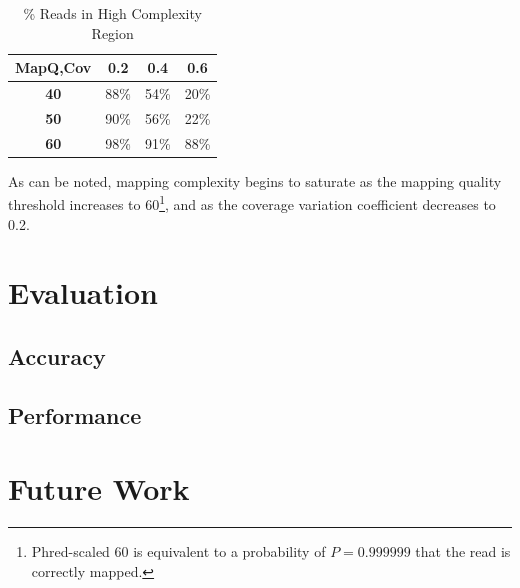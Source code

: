 \documentclass{acm_proc_article-sp}
\begin{document}
\begin{table}[h]
\caption{\% Reads in High Complexity Region}
\begin{center}
\begin{tabular}{| c || c | c | c |}
\hline
\bf MapQ,Cov & \bf 0.2 & \bf 0.4 & \bf 0.6 \\
\hline
\hline
\bf 40 & 88\% & 54\% & 20\% \\
\bf 50 & 90\% & 56\% & 22\% \\
\bf 60 & 98\% & 91\% & 88\% \\
\hline 
\end{tabular}
\end{center}
\label{tab:filter}
\end{table}

As can be noted, mapping complexity begins to saturate as the mapping quality threshold increases to 60\footnote{Phred-scaled 60 is
equivalent to a probability of $P=0.999999$ that the read is correctly mapped.}, and as the coverage variation coefficient decreases to 0.2.

\section{Evaluation}
\label{sec:evaluation}


\subsection{Accuracy}
\label{sec:accuracy}


\subsection{Performance}
\label{sec:performance}


\section{Future Work}
\label{sec:future-work}

\end{document}
